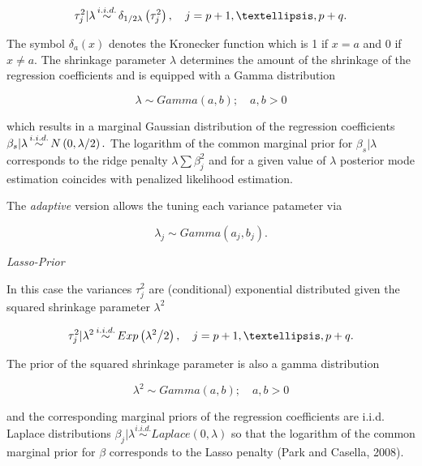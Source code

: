 \documentclass[11pt,a4paper,twoside]{bayesxarticle}
\begin{document}
\begin{equation}
\label{ZEqnNum108379}
\tau _{j}^{2} |\lambda \mathop{\sim }\limits^{i.i.d.} \delta _{{1\mathord{\left/
{\vphantom {1 2\lambda }} \right. \kern-\nulldelimiterspace} 2\lambda } } \left(
\tau _{j}^{2} \right),\quad j=p+1,\ldots,p+q.
\end{equation}

The symbol $\delta _{a} (x)$ denotes the Kronecker function which is 1 if $x=a$ and
0 if $x\ne a$. The shrinkage parameter $\lambda $ determines the amount of the shrinkage
of the regression coefficients and is equipped with a Gamma distribution

\[\lambda \sim Gamma\left(a,b\right);\quad a,b>0\]

which results in a marginal Gaussian distribution of the regression coefficients $\beta _{s} |\lambda \mathop{\sim
}\limits^{i.i.d.} N\left(0,{\lambda \mathord{\left/ { \vphantom {\lambda  2}} \right. \kern-\nulldelimiterspace} 2} \right).$
The logarithm of the common marginal prior for $\beta _{s} |\lambda $ corresponds to the ridge penalty $\lambda \sum \beta
_{j}^{2}  $ and for a given value of $\lambda $ posterior mode estimation coincides with penalized likelihood estimation.

The {\em adaptive} version allows the tuning each variance patameter via

\[{\lambda _j}\sim Gamma\left( {{a_j},{b_j}} \right).\]


{\em Lasso-Prior}

In this case the variances $\tau _{j}^{2} $ are (conditional) exponential distributed
given the squared shrinkage parameter $\lambda ^{2} $

\begin{equation}
\label{ZEqnNum508369}
\tau _{j}^{2} |\lambda ^{2} \mathop{\sim }\limits^{i.i.d.} Exp\left({\lambda ^{2}
\mathord{\left/ {\vphantom {\lambda ^{2}  2}} \right. \kern-\nulldelimiterspace}
2} \right),\quad j=p+1,\ldots,p+q.
\end{equation}

The prior of the squared shrinkage parameter is also a gamma distribution

\[\lambda ^{2} \sim Gamma\left(a,b\right);\quad a,b>0\]

and the corresponding marginal priors of the regression coefficients are i.i.d. Laplace
distributions $\beta _{j} |\lambda \mathop{\sim }\limits^{i.i.d.} Laplace\left(0,
\lambda \right)$ so that the logarithm of the common marginal prior for $\beta $ corresponds
to the Lasso penalty (Park and Casella, 2008).
\end{document}
